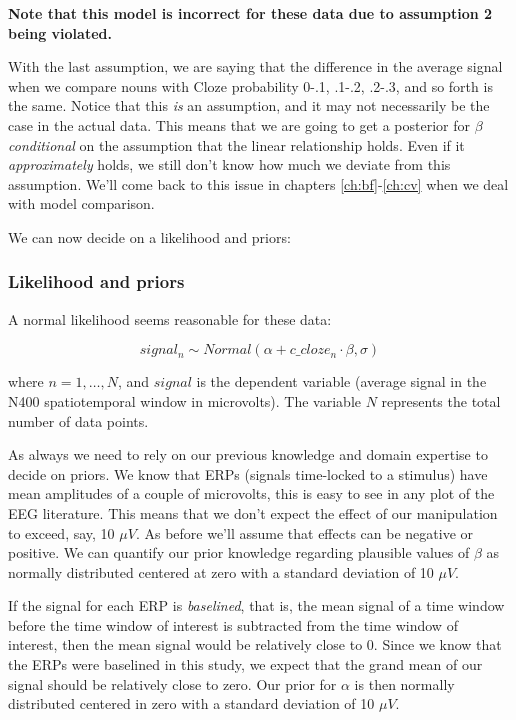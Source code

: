 \documentclass[12pt,]{krantz}
\theoremstyle{definition}
\theoremstyle{definition}
\theoremstyle{definition}
\theoremstyle{remark}
\begin{document}
\textbf{Note that this model is incorrect for these data due to assumption 2 being violated.}

With the last assumption, we are saying that the difference in the average signal when we compare nouns with Cloze probability 0-.1, .1-.2, .2-.3, and so forth is the same. Notice that this \emph{is} an assumption, and it may not necessarily be the case in the actual data. This means that we are going to get a posterior for \(\beta\) \emph{conditional} on the assumption that the linear relationship holds. Even if it \emph{approximately} holds, we still don't know how much we deviate from this assumption. We'll come back to this issue in chapters \ref{ch:bf}-\ref{ch:cv} when we deal with model comparison.

We can now decide on a likelihood and priors:

\hypertarget{likelihood-and-priors-1}{%
\subsubsection{Likelihood and priors}\label{likelihood-and-priors-1}}

A normal likelihood seems reasonable for these data:

\begin{equation}
   signal_n \sim Normal( \alpha + c\_cloze_n \cdot \beta,\sigma)
  \label{eq:Mcp}
 \end{equation}

where \(n =1, \ldots, N\), and \(signal\) is the dependent variable (average signal in the N400 spatiotemporal window in microvolts). The variable \(N\) represents the total number of data points.

As always we need to rely on our previous knowledge and domain expertise to decide on priors. We know that ERPs (signals time-locked to a stimulus) have mean amplitudes of a couple of microvolts, this is easy to see in any plot of the EEG literature. This means that we don't expect the effect of our manipulation to exceed, say, 10 \(\mu V\). As before we'll assume that effects can be negative or positive. We can quantify our prior knowledge regarding plausible values of \(\beta\) as normally distributed centered at zero with a standard deviation of 10 \(\mu V\).

If the signal for each ERP is \emph{baselined}, that is, the mean signal of a time window before the time window of interest is subtracted from the time window of interest, then the mean signal would be relatively close to 0. Since we know that the ERPs were baselined in this study, we expect that the grand mean of our signal should be relatively close to zero. Our prior for \(\alpha\) is then normally distributed centered in zero with a standard deviation of 10 \(\mu V\).
\end{document}
